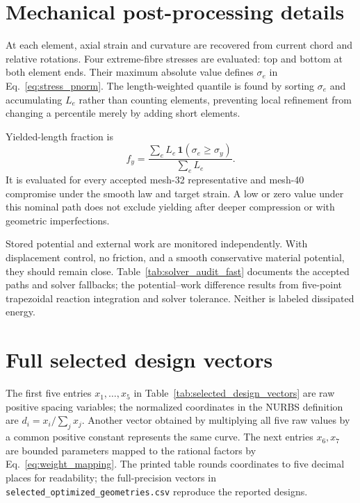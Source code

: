\documentclass[11pt]{article}
\begin{document}
\section{Mechanical post-processing details}

At each element, axial strain and curvature are recovered from current chord and relative rotations. Four extreme-fibre stresses are evaluated: top and bottom at both element ends. Their maximum absolute value defines $\sigma_e$ in Eq.~\eqref{eq:stress_pnorm}. The length-weighted quantile is found by sorting $\sigma_e$ and accumulating $L_e$ rather than counting elements, preventing local refinement from changing a percentile merely by adding short elements.

Yielded-length fraction is
\begin{equation}
f_y=\frac{\sum_eL_e\,\mathbf 1(\sigma_e\ge\sigma_y)}{\sum_eL_e}.
\end{equation}
It is evaluated for every accepted mesh-32 representative and mesh-40 compromise under the smooth law and target strain. A low or zero value under this nominal path does not exclude yielding after deeper compression or with geometric imperfections.

Stored potential and external work are monitored independently. With displacement control, no friction, and a smooth conservative material potential, they should remain close. Table~\ref{tab:solver_audit_fast} documents the accepted paths and solver fallbacks; the potential--work difference results from five-point trapezoidal reaction integration and solver tolerance. Neither is labeled dissipated energy.

\section{Full selected design vectors}



The first five entries $x_1,\ldots,x_5$ in Table~\ref{tab:selected_design_vectors} are raw positive spacing variables; the normalized coordinates in the NURBS definition are $d_i=x_i/\sum_jx_j$. Another vector obtained by multiplying all five raw values by a common positive constant represents the same curve. The next entries $x_6,x_7$ are bounded parameters mapped to the rational factors by Eq.~\eqref{eq:weight_mapping}. The printed table rounds coordinates to five decimal places for readability; the full-precision vectors in \texttt{selected\_optimized\_geometries.csv} reproduce the reported designs.
\end{document}
